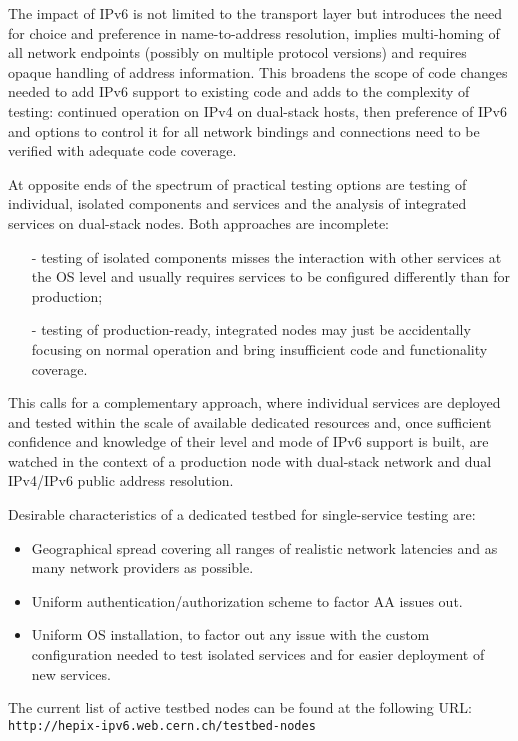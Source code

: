 The impact of IPv6 is not limited to the transport layer 
but introduces the need for choice and preference in name-to-address 
resolution, implies multi-homing of all network endpoints (possibly on 
multiple protocol versions) and requires opaque handling of address 
information. This broadens the scope of code changes needed to add
IPv6 support to existing code and adds to the complexity of testing:
continued operation on IPv4 on dual-stack hosts, then preference of IPv6 and 
options to control it for all network bindings and connections
need to be verified with adequate code coverage.
\par
At opposite ends of the spectrum of practical testing options are
testing of individual, isolated components and services and the analysis of 
integrated services on dual-stack nodes. Both approaches are incomplete:
\begin{itemize}
\item[-] testing of isolated components misses the interaction with other
services at the OS level and usually requires services to be configured
differently than for production;
\item[-] testing of production-ready, integrated nodes may just be 
accidentally focusing on normal operation and bring insufficient 
code and functionality coverage.
\end{itemize}
This calls for a complementary approach,
where individual services are deployed and tested within the scale of
available dedicated resources and, once sufficient confidence and knowledge
of their level and mode of IPv6 support is built, are watched in the context
of a production node with dual-stack network and dual IPv4/IPv6 public address
resolution.
\par
Desirable characteristics of a dedicated testbed for single-service testing are:
\begin{itemize}
\item Geographical spread covering all ranges of realistic network latencies
and as many network providers as possible.
\item Uniform authentication/authorization scheme to factor AA issues out.
\item Uniform OS installation, to factor out any issue with the custom 
configuration needed to test isolated services and for easier
deployment of new services.
\end{itemize}
The current list of active testbed nodes can be found at the following URL:\\
{\tt http://hepix-ipv6.web.cern.ch/testbed-nodes}\\
